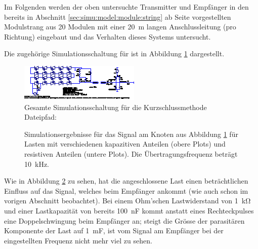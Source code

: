 Im  Folgenden   werden  der  oben  untersuchte   Transmitter  und  Empf\"anger
in  den  bereits  in  Abschnitt  \ref{sec:simu:model:module:string}  ab  Seite
\pageref{sec:simu:model:module:string}   vorgestellten   Modulstrang  aus   20
Modulen  mit  einer  \SI{20}{\meter} langen  Anschlussleitung  (pro  Richtung)
eingebaut und das Verhalten dieses Systems untersucht.

Die zugeh\"orige  Simulationsschaltung f\"ur   ist  in Abbildung
\ref{fig:ltspice:shortcircuit:complete} dargestellt.

\begin{figure}[h!tb]
    \includegraphics[width=\textwidth]{images/ltspice/jac/shortcircuit.eps}
    \caption[-Schaltung f\"ur Kurzschlussmethode, Modulstrang]
    {%
        Gesamte Simulationsschaltung f\"ur die Kurzschlussmethode\protect\\
        Dateipfad: %
    }
    \label{fig:ltspice:shortcircuit:complete}
\end{figure}

\begin{figure}[h!tb]
    \centering
    
    \caption[Simulationsergebnisse Kurzschlussmethode]{%
        Simulationsergebnisse  f\"ur  das  Signal  am  Knoten  
        aus  Abbildung  \ref{fig:ltspice:shortcircuit:complete}  f\"ur  Lasten
        mit   verschiedenen    kapazitiven   Anteilen       (obere
        Plots)  und  resistiven   Anteilen    (untere  Plots). Die
        \"Ubertragungsfrequenz betr\"agt \SI{10}{\kilo\hertz}.%
    }
    \label{fig:simu:short:complete}
\end{figure}

Wie   in   Abbildung   \ref{fig:simu:short:complete}   zu   sehen,   hat   die
angeschlossene   Last  einen   betr\"achtlichen  Einfluss   auf  das   Signal,
welches  beim  Empf\"anger  ankommt  (wie  auch  schon  im  vorigen  Abschnitt
beobachtet).   Bei einem  Ohm'schen Lastwiderstand  von \SI{1}{\kilo\ohm}  und
einer Lastkapazit\"at  von bereits  \SI{100}{\nano\farad} kommt  anstatt eines
Rechteckpulses eine Doppelschwingung beim  Empf\"anger an; steigt die Gr\"osse
der parasit\"aren Komponente der Last auf \SI{1}{\milli\farad}, ist vom Signal
am Empf\"anger bei der eingestellten Frequenz nicht mehr viel zu sehen.

